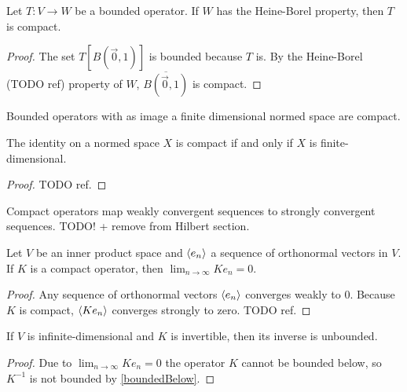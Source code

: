 \begin{lemma}
Let $T:V\to W$ be a bounded operator. If $W$ has the Heine-Borel property, then $T$ is compact.
\end{lemma}
\begin{proof}
The set $T[B(\vec{0},1)]$ is bounded because $T$ is. By the Heine-Borel (TODO ref) property of $W$, $\overline{B(\vec{0},1)}$ is compact.
\end{proof}
\begin{corollary}
Bounded operators with as image a finite dimensional normed space are compact.
\end{corollary}
\begin{corollary}
The identity on a normed space $X$ is compact \textup{if and only if} $X$ is finite-dimensional.
\end{corollary}
\begin{proof}
TODO ref. 
\end{proof}

\begin{proposition}
Compact operators map weakly convergent sequences to strongly convergent sequences. TODO! + remove from Hilbert section.
\end{proposition}
\begin{corollary} \label{limitCompactImageOrthonormalSequence}
Let $V$ be an inner product space and $\left\langle e_n \right\rangle$ a sequence of orthonormal vectors in $V$. If $K$ is a compact operator, then $\lim_{n\to\infty}Ke_n = 0$.
\end{corollary}
\begin{proof}
Any sequence of orthonormal vectors $\left\langle e_n \right\rangle$ converges weakly to $0$. Because $K$ is compact, $\left\langle Ke_n \right\rangle$ converges strongly to zero. TODO ref.
\end{proof}
\begin{corollary}
If $V$ is infinite-dimensional and $K$ is invertible, then its inverse is unbounded.
\end{corollary}
\begin{proof}
Due to $\lim_{n\to\infty}Ke_n = 0$ the operator $K$ cannot be bounded below, so $K^{-1}$ is not bounded by \ref{boundedBelow}.
\end{proof}

